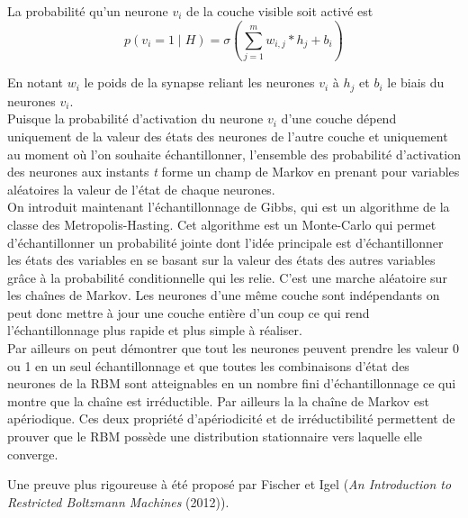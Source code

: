 \documentclass[a4paper,oneside]{report}
\begin{document}
                La probabilité qu'un neurone \begin{math}v_{i}\end{math} de la
                couche visible soit activé est \begin{equation}p( v_{i} =1 \mid H) = 
\sigma(\sum_{j=1}^{m} w_{i,j} * h_{j} + b_{i}) \end{equation}

				En notant \textit{$w_{i}$} le poids de la synapse reliant les neurones \textit{$v_{i}$} 
à \textit{$h_{j}$} et \textit{$b_{i}$} le biais du neurones \textit{$v_{i}$}.\\
        
					Puisque la probabilité  d'activation du neurone \textit{$v_{i}$} d'une couche dépend 
uniquement de la valeur des états des neurones de l'autre couche et uniquement au 
moment où l'on souhaite 
échantillonner, l'ensemble des probabilité d'activation des neurones aux instants \textit{t} forme 
un champ de Markov en prenant pour variables aléatoires la valeur de l'état de chaque neurones.\\


                On introduit maintenant l'échantillonnage de Gibbs, qui est un
                algorithme de la classe des Metropolis-Hasting. Cet algorithme
               est un Monte-Carlo qui permet d'échantillonner un probabilité jointe dont l'idée principale
                est d'échantillonner les états des variables en se basant sur la valeur des états
                des autres variables grâce à la probabilité conditionnelle qui les relie. C'est une marche aléatoire sur les chaînes de Markov.
Les neurones d'une même couche sont indépendants on peut donc mettre à jour une couche 
entière d'un coup ce qui rend l'échantillonnage plus rapide et plus simple à réaliser. \\

           Par ailleurs on peut démontrer que tout les neurones peuvent prendre les valeur 0 ou 1
 en un seul échantillonnage et que toutes les combinaisons d'état des neurones de la RBM 
sont atteignables en un nombre fini d'échantillonnage ce qui montre que la chaîne est irréductible. Par ailleurs la la chaîne de Markov est apériodique. 
Ces deux propriété d'apériodicité et de irréductibilité permettent de prouver que le RBM
 possède une distribution stationnaire vers laquelle elle converge. 

               Une preuve plus rigoureuse à été proposé par Fischer et Igel (\textit{An Introduction to Restricted Boltzmann Machines} (2012)).\\
\end{document}
